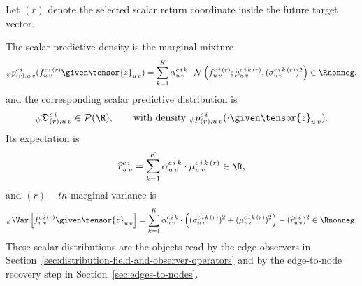 Let $(r)$ denote the selected scalar return coordinate
inside the future target vector.

The scalar predictive density is the marginal mixture
\[
  {}_{\psi}p_{(r),u\,v}^{c\,i}(f_{u\,v}^{c\,i\,(r)}\given\tensor{z}_{u\,v})
  =
  \sum_{k=1}^{K}
  \alpha_{u\,v}^{c\,i\,k}\cdot
  \mathcal{N}
  \left(
    f_{u\,v}^{c\,i\,(r)};
    \mu_{u\,v}^{c\,i\,k\,(r)},
    (\sigma_{u\,v}^{c\,i\,k\,(r)})^{2}
  \right)
  \in\Rnonneg.
\]
and the corresponding scalar predictive distribution is
\[
  {}_{\psi}\mathfrak{D}_{(r),u\,v}^{c\,i}
  \in\mathcal{P}(\R),
  \qquad
  \text{with density }
  {}_{\psi}p_{(r),u\,v}^{c\,i}(\cdot\given\tensor{z}_{u\,v}).
\]
Its expectation is
\[
  \widehat{r}_{u\,v}^{c\,i}
  =
  \sum_{k=1}^{K}
  \alpha_{u\,v}^{c\,i\,k}\cdot
  \mu_{u\,v}^{c\,i\,k\,(r)}
  \in\R,
\]
and $(r)-th$ marginal variance is
\[
  {}_{\psi}\Var
  \left[
    f_{u\,v}^{c\,i\,(r)}
    \given
    \tensor{z}_{u\,v}
  \right]
  =
  \sum_{k=1}^{K}
  \alpha_{u\,v}^{c\,i\,k}\cdot
  \left(
    (\sigma_{u\,v}^{c\,i\,k\,(r)})^{2}
    +
    (\mu_{u\,v}^{c\,i\,k\,(r)})^{2}
  \right)
  -
  (\widehat{r}_{u\,v}^{c\,i})^{2}
  \in\Rnonneg.
\]
These scalar distributions are the objects read by the edge observers in
Section~\ref{sec:distribution-field-and-observer-operators} and by the
edge-to-node recovery step in Section~\ref{sec:edges-to-nodes}.
